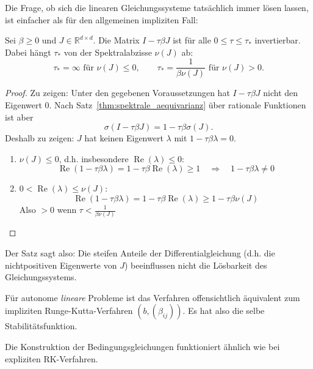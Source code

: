 \documentclass[german]{scrreprt}
\newcommand{\R}{\mathbb R}
\renewcommand{\Re}{\operatorname{Re}}
\theoremstyle{plain}
\theoremstyle{nonumberplain}
\theoremstyle{nonumberplain}
\theoremstyle{nonumberplain}
\newtheorem{proof}{Beweis}
\begin{document}
Die Frage, ob sich die linearen Gleichungssysteme tatsächlich immer lösen lassen, ist einfacher als für den allgemeinen impliziten Fall:
\begin{lemma}
	Sei $\beta \geq 0$ und $J\in\R^{d\times d}$. Die Matrix $I-\tau\beta J$ ist für alle $0\leq \tau\leq \tau_*$ invertierbar. Dabei hängt $\tau_*$ von der Spektralabzisse $\nu(J)$ ab:
	\begin{equation*}
	\tau_* = \infty\text{ für } \nu(J)\leq 0, \qquad \tau_* =  \frac{1}{\beta\nu(J)} \text{ für }	\nu(J) > 0.
	\end{equation*}
\end{lemma}
\begin{proof}
	Zu zeigen: Unter den gegebenen Voraussetzungen hat $I-\tau\beta J$ nicht den Eigenwert $0$. Nach Satz~\eqref{thm:spektrale_aequivarianz} über rationale Funktionen ist aber
	\begin{equation*}
	\sigma(I-\tau\beta J) = 1-\tau\beta\sigma(J).
	\end{equation*}
	Deshalb zu zeigen: $J$ hat keinen Eigenwert $\lambda$ mit $1-\tau\beta\lambda = 0$.\\
	\begin{enumerate}[label=Fall \arabic*:, leftmargin=*]
		\item $\nu(J) \leq 0$, d.h. insbesondere $\Re(\lambda)\leq 0$:
		\begin{equation*}
		\Re(1-\tau\beta\lambda) = 1-\tau\beta \Re(\lambda) \geq 1 \quad  \Rightarrow \quad 1-\tau\beta\lambda \neq 0
		\end{equation*}
		\item $0<\Re(\lambda)\leq \nu(J)$:
		\begin{equation*}
		\Re(1-\tau\beta\lambda) = 1 - \tau \beta \Re(\lambda) \geq 1 - \tau\beta\nu(J)
		\end{equation*}
		Also $>0$ wenn $\tau < \frac{1}{\beta\nu(J)}$
	\end{enumerate}
\end{proof}

Der Satz sagt also: Die steifen Anteile der Differentialgleichung (d.h. die nichtpositiven Eigenwerte von $J$) beeinflussen nicht die Lösbarkeit des Gleichungssystems.

Für autonome \textit{lineare} Probleme ist das Verfahren offensichtlich äquivalent zum impliziten Runge-Kutta-Verfahren $(b, (\beta_{ij}))$.  Es hat also die selbe Stabilitätsfunktion.

Die Konstruktion der Bedingungsgleichungen funktioniert ähnlich wie bei expliziten RK-Verfahren.




\end{document}
